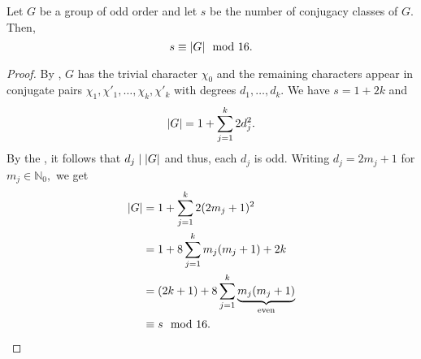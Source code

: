 \begin{cor}
	Let $G$ be a group of odd order and let $s$ be the number of conjugacy classes of $G.$ Then, 
	\begin{equation*} 
		s \equiv {\left\lvert G \right\lvert} \mod{16}.
	\end{equation*}
\end{cor}
\begin{proof} 
	By , $G$ has the trivial character $\chi_0$ and the remaining characters appear in conjugate pairs $\chi_1, \chi'_1, \ldots, \chi_k, \chi'_k$ with degrees $d_1, \ldots, d_k.$ We have $s = 1 + 2k$ and
	\begin{equation*} 
		{\left\lvert G \right\lvert} = 1 + \sum_{j = 1}^{k}2d_j^2.
	\end{equation*}
	By the , it follows that $d_j \mid {\left\lvert G \right\lvert}$ and thus, each $d_j$ is odd. Writing $d_j = 2m_j + 1$ for $m_j \in \mathbb{N}_0,$ we get
	\begin{align*} 
		{\left\lvert G \right\lvert} &= 1 + \sum_{j = 1}^{k}2(2m_j + 1)^2\\
		&= 1 + 8\sum_{j = 1}^{k}m_j(m_j + 1) + 2k\\
		&= (2k + 1) + 8\sum_{j = 1}^{k}\underbrace{m_j(m_j + 1)}_{\text{even}}\\
		&\equiv s \mod{16}. \qedhere
	\end{align*}
\end{proof}